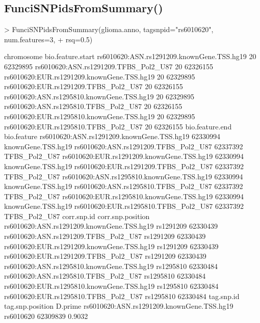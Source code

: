 \documentclass[a4paper]{article}
\begin{document}
\subsection*{FunciSNPidsFromSummary()}
\begin{Schunk}
\begin{Sinput}
> FunciSNPidsFromSummary(glioma.anno, tagsnpid="rs6010620", num.features=3, 
+ rsq=0.5)
\end{Sinput}
\begin{Soutput}
                                           chromosome bio.feature.start
rs6010620:ASN.rs1291209.knownGene.TSS.hg19         20          62329895
rs6010620:ASN.rs1291209.TFBS_Pol2_U87              20          62326155
rs6010620:EUR.rs1291209.knownGene.TSS.hg19         20          62329895
rs6010620:EUR.rs1291209.TFBS_Pol2_U87              20          62326155
rs6010620:ASN.rs1295810.knownGene.TSS.hg19         20          62329895
rs6010620:ASN.rs1295810.TFBS_Pol2_U87              20          62326155
rs6010620:EUR.rs1295810.knownGene.TSS.hg19         20          62329895
rs6010620:EUR.rs1295810.TFBS_Pol2_U87              20          62326155
                                           bio.feature.end        bio.feature
rs6010620:ASN.rs1291209.knownGene.TSS.hg19        62330994 knownGene.TSS.hg19
rs6010620:ASN.rs1291209.TFBS_Pol2_U87             62337392      TFBS_Pol2_U87
rs6010620:EUR.rs1291209.knownGene.TSS.hg19        62330994 knownGene.TSS.hg19
rs6010620:EUR.rs1291209.TFBS_Pol2_U87             62337392      TFBS_Pol2_U87
rs6010620:ASN.rs1295810.knownGene.TSS.hg19        62330994 knownGene.TSS.hg19
rs6010620:ASN.rs1295810.TFBS_Pol2_U87             62337392      TFBS_Pol2_U87
rs6010620:EUR.rs1295810.knownGene.TSS.hg19        62330994 knownGene.TSS.hg19
rs6010620:EUR.rs1295810.TFBS_Pol2_U87             62337392      TFBS_Pol2_U87
                                           corr.snp.id corr.snp.position
rs6010620:ASN.rs1291209.knownGene.TSS.hg19   rs1291209          62330439
rs6010620:ASN.rs1291209.TFBS_Pol2_U87        rs1291209          62330439
rs6010620:EUR.rs1291209.knownGene.TSS.hg19   rs1291209          62330439
rs6010620:EUR.rs1291209.TFBS_Pol2_U87        rs1291209          62330439
rs6010620:ASN.rs1295810.knownGene.TSS.hg19   rs1295810          62330484
rs6010620:ASN.rs1295810.TFBS_Pol2_U87        rs1295810          62330484
rs6010620:EUR.rs1295810.knownGene.TSS.hg19   rs1295810          62330484
rs6010620:EUR.rs1295810.TFBS_Pol2_U87        rs1295810          62330484
                                           tag.snp.id tag.snp.position D.prime
rs6010620:ASN.rs1291209.knownGene.TSS.hg19  rs6010620         62309839  0.9032

\end{Soutput}
\end{Schunk}
\end{document}
